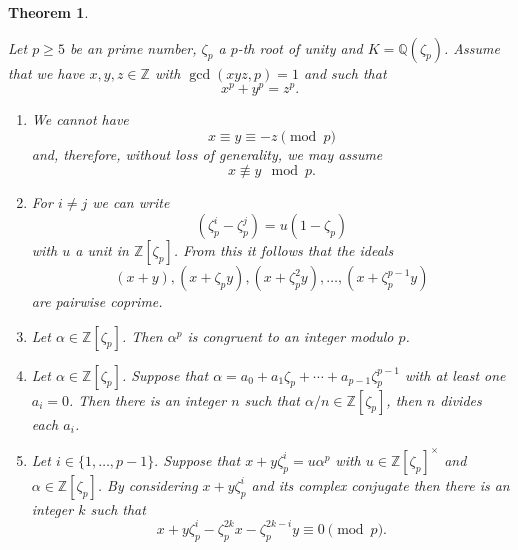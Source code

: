 \documentclass[11pt,a4paper]{amsart}
\theoremstyle{plain}
\newtheorem{theorem}[subsection]{Theorem}
\theoremstyle{definition}
\theoremstyle{definition}
\newcommand{\ZZ}{\mathbb{Z}}
\def\QQ{\mathbb{Q}}
\def \a{\alpha}
\begin{document}
	\begin{theorem}\label{theorem:FLT facts}
		
		Let $p \geq 5$ be an prime number, $\zeta_p$ a $p$-th root of unity and $K=\QQ(\zeta_p)$.  Assume that we have $x,y,z \in \ZZ$ with $\gcd(xyz,p)=1$ and such that \[x^p+y^p=z^p.\] 
		
		\begin{enumerate}
			\item We cannot have  \[x \equiv y \equiv -z \pmod p\] and, therefore, without loss of generality, we may assume \[x \not \equiv y \mod p.\]
			
			\item For $i \neq j$ we can write \[(\zeta_p^i-\zeta_p^j)=u(1-\zeta_p)\] with $u$ a unit in $\ZZ[\zeta_p]$. From this it follows that the ideals \[(x+y),(x+\zeta_py),(x+\zeta_p^2y),\dots,(x+\zeta_p^{p-1}y)\] are pairwise coprime. 
			
			\item Let $\a \in \ZZ[\zeta_p]$. Then $\a^p$ is congruent to an integer modulo $p$.
			
			\item Let $\a \in \ZZ[\zeta_p]$.   Suppose that $\a=a_0+a_1\zeta_p+\cdots+a_{p-1}\zeta_p^{p-1}$ with at least one $a_i=0$. Then there is an integer $n$ such that $\a/n \in \ZZ[\zeta_p]$, then $n$ divides each $a_i$. 
			
			
			\item   Let $i \in \{1,\dots,p-1\}.$ Suppose that $x+y\zeta_p^i=u \a^p$ with $u \in \ZZ[\zeta_p]^\times$ and $\a \in \ZZ[\zeta_p]$. By considering $x+y\zeta_p^i$ and its complex conjugate then there is an integer $k$ such that \[x+y\zeta_p^i-\zeta_p^{2k}x-\zeta_p^{2k-i}y \equiv 0 \pmod p.\]
			
			
		\end{enumerate}
		
	\end{theorem}
	
	
	
\end{document}
